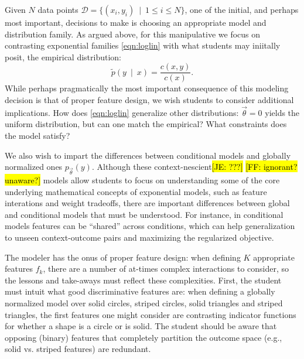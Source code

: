 \documentclass[11pt,letterpaper]{article}
\newcommand{\Note}[1]{}
\renewcommand{\Note}[1]{\hl{[#1]}}
\newcommand{\NoteSigned}[3]{{\sethlcolor{#2}\Note{#1: #3}}}
\newcommand{\NoteFF}[1]{\NoteSigned{FF}{LightBlue}{#1}}
\newcommand{\NoteJE}[1]{\NoteSigned{JE}{LightGreen}{#1}}
\newcommand{\empirical}[0]{\ensuremath{\tilde{p}}}
\newcommand{\Data}[0]{\ensuremath{\mathcal{D}}}
\begin{document}
Given $N$ data points $\Data{} = \{( x_i, y_i)\ \mid\ 1 \le i \le N\}$, one of the initial, and perhaps most important, decisions 
to make is choosing an appropriate model and distribution family. As argued above, for this manipulative we focus on 
contrasting exponential families \eqref{eqn:loglin} with what students may iniitally posit, the empirical distribution:
\begin{equation}
\empirical\left(y\ \mid\ x\right) = \frac{c(x,y)}{c(x)}.
\label{eqn:empirical_distr}
\end{equation}
While perhaps pragmatically the most important consequence of this modeling decision is that of 
proper feature design, we wish students to consider additional implications.  
How does \eqref{eqn:loglin} generalize other distributions: $\vec{\theta} = 0$ 
yields the uniform distribution, but can one match the empirical? What constraints does 
the model satisfy?
 
We also wish to impart the differences between conditional models and
globally normalized ones
$p_{\vec{\theta}}\left(y\right)$. Although
these context-nescient\NoteJE{???} 
\NoteFF{ignorant? unaware?} models allow students to focus on
understanding some of the core underlying mathematical concepts of
exponential models, such as feature interations and weight tradeoffs,
there are important differences between global and conditional models
that must be understood. For instance, in conditional models features
can be ``shared'' across conditions, which can
help %
generalization to unseen context-outcome pairs and maximizing the
regularized objective.

The modeler has the onus of proper feature design: when defining $K$ 
appropriate features $f_k$, there are a number of at-times complex interactions 
to consider, so the lessons and take-aways must reflect these complexities. 
First, the student must intuit what good discriminative features are: 
when defining a globally normalized model over solid circles, striped 
circles, solid triangles and striped triangles, the first features 
one might consider are contrasting indicator functions for whether a shape
is a circle or is solid. The student should be aware that opposing (binary) features 
that completely partition the outcome space (e.g., solid vs. striped features) are redundant.
\end{document}
